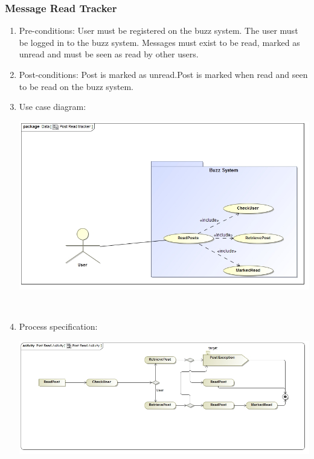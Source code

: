 \documentclass[hidelinks, 12pt, oneside]{article}
\begin{document}
\subsubsection{Message Read Tracker}
\begin{enumerate}
 \item Pre-conditions:  User must be registered on the buzz system. The user must be logged in to the buzz system. Messages must exist to be read, marked as unread and must be seen as read by other users.

 \item Post-conditions: Post is marked as unread.Post is marked when read and seen to be read on the buzz system.

\item Use case diagram:\\
   \centerline{\includegraphics[scale=0.4]{PostReadTracker}}\\
    \item Process specification:\\ 
 \centerline{\includegraphics[scale=0.4]{PostReadActivity}} 
\end{enumerate}
\end{document}

